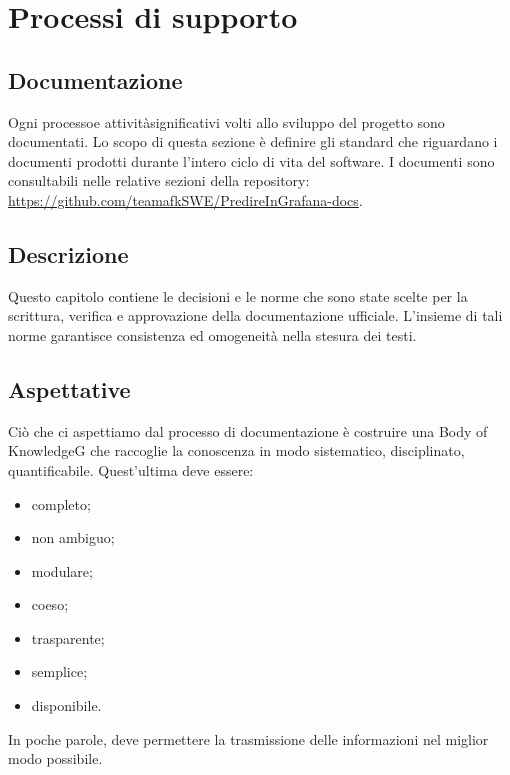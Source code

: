 \section{Processi di supporto}
\subsection{Documentazione}
Ogni processo\glo e attività\glo significativi volti allo sviluppo del progetto sono documentati. Lo scopo di questa sezione è definire gli standard che riguardano i documenti prodotti durante l'intero ciclo di vita del software. I documenti sono consultabili nelle relative sezioni della repository\glo: \url{https://github.com/teamafkSWE/PredireInGrafana-docs}. 		

\subsection{Descrizione}
Questo capitolo contiene le decisioni e le norme che sono state scelte per la scrittura, verifica e approvazione della documentazione ufficiale. L'insieme di tali norme garantisce consistenza ed omogeneità nella stesura dei testi.

\subsection{Aspettative}
Ciò che ci aspettiamo dal processo di documentazione è costruire una Body of KnowledgeG che raccoglie la conoscenza in modo sistematico, disciplinato, quantificabile. Quest'ultima deve essere: \begin{itemize}
\item completo;
\item non ambiguo;
\item modulare;
\item coeso;
\item trasparente;
\item semplice;
\item disponibile.
\end{itemize}
In poche parole, deve permettere la trasmissione delle informazioni nel miglior modo possibile.

